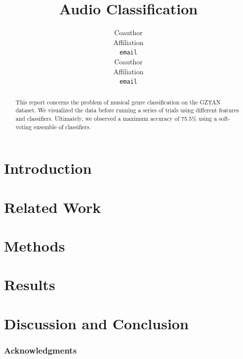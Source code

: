 \documentclass{article} %
\title{Audio Classification}
\author{
Coauthor\\
Affiliation\\
\texttt{email} \\
\And
Coauthor \\
Affiliation \\
\texttt{email} \\
}
\begin{document}
\maketitle

\begin{abstract}
This report concerns the problem of musical genre classification on the GZTAN dataset. We visualized the data before running a series of trials using different features and classifiers. Ultimately, we observed a maximum accuracy of 75.5\% using a soft-voting ensemble of classifiers. 
\end{abstract}

\section{Introduction}



\section{Related Work}



\section{Methods}



\section{Results}



\section{Discussion and Conclusion}



\subsubsection*{Acknowledgments}





\end{document}
